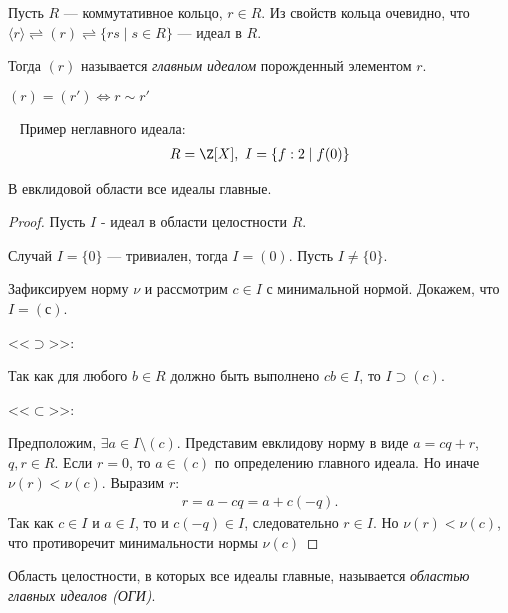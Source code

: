 \begin{defn}
    Пусть $R$ --- коммутативное кольцо, $r \in R$.
    Из свойств кольца очевидно, что $\langle r \rangle \rightleftharpoons  (r) \rightleftharpoons \{ rs \mid s \in R \}$ --- идеал в $R$.

    Тогда $(r)$ называется \emph{главным идеалом} порожденный элементом $r$.
\end{defn}

\begin{notice}
    $(r) = (r') \iff r \sim r'$
\end{notice}

\begin{example}~
    Пример неглавного идеала:
    \begin{gather*}
        R = \Z[X],~I = \{ f : 2 \mid f(0) \}
    \end{gather*}
\end{example}

\begin{theorem-non}
    В евклидовой области все идеалы главные.
\end{theorem-non}

\begin{proof}
    Пусть $I$ - идеал в области целостности $R$.

    Случай $I = \{0\}$ --- тривиален, тогда $I = (0)$. Пусть $I \neq \{0\}$.

    Зафиксируем норму $\nu$ и рассмотрим $c \in I$ с минимальной нормой. Докажем, что $I = (с)$.

    <<$\supset$>>:
    
    Так как для любого $b \in R$ должно быть выполнено $cb \in I$, то $I \supset (c)$.
    
    <<$\subset$>>:

    Предположим, $\exists a \in I \setminus (c)$. Представим евклидову норму в виде $a = cq + r$, $q, r \in R$.
    Если $r = 0$, то $a \in (c)$ по определению главного идеала. Но иначе $\nu(r) < \nu(c)$.
    Выразим $r$:
    \begin{gather*}
        r = a - cq = a + c(-q).
    \end{gather*} 
    Так как $c \in I$ и $a \in I$, то и $c(-q) \in I$, следовательно $r \in I$.
    Но $\nu(r) < \nu(c)$, что противоречит минимальности нормы $\nu(c)$
\end{proof}

\begin{defn}   
    Область целостности, в которых все идеалы главные, называется \emph{областью главных идеалов (ОГИ)}.
\end{defn}


